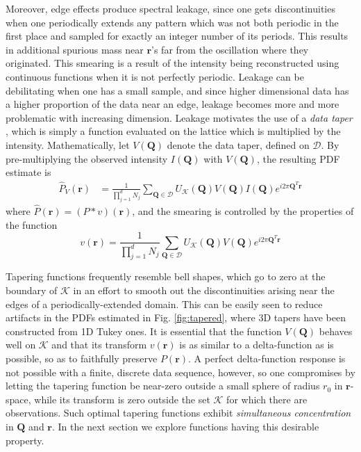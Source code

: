 Moreover, edge effects produce spectral leakage, since one gets discontinuities when
one periodically extends any pattern which was not both periodic in the first place
and sampled for exactly an integer number of its periods. This results in additional
spurious mass near $\mathbf{r}$'s far from the oscillation where they originated.
This smearing is a result of the intensity being reconstructed using continuous
functions when it is not perfectly periodic. Leakage can be debilitating when one has
a small sample, and since higher dimensional data has a higher proportion of the data
near an edge, leakage becomes more and more problematic with increasing dimension.
Leakage motivates the use of a \textit{data taper} \cite{brillinger1981,harris1978},
which is simply a function evaluated on the lattice which is multiplied by the
intensity. Mathematically, let $V(\mathbf{Q})$ denote the data taper, defined on
$\mathcal{D}$. By pre-multiplying the observed intensity $I(\mathbf{Q})$ with
$V(\mathbf{Q})$, the resulting PDF estimate is
\begin{align} \label{eq:Tapersneeded}
  \widehat{P}_V(\mathbf{r}) &= \frac{1}{\prod_{j=1}^d N_j} \sum_{\mathbf{Q}\in
  \mathcal{D}} U_{\mathcal{K}} (\mathbf{Q}) V(\mathbf{Q}) I(\mathbf{Q}) e^{i 2 \pi
  \mathbf{Q}^T\mathbf{r}} 
\end{align}
where  $\widehat{P}(\mathbf{r}) = (P*v)(\mathbf{r})$, and the smearing is controlled
by the properties of the function \begin{equation}
 v(\mathbf{r}) = \frac{1}{\prod_{j=1}^d N_j} \sum_{\mathbf{Q}\in
  \mathcal{D}} U_{\mathcal{K}} (\mathbf{Q}) V (\mathbf{Q}) e^{i 2 \pi
  \mathbf{Q}^T\mathbf{r}}
\end{equation}

Tapering functions frequently resemble bell shapes, which go to zero at the boundary
of $\mathcal{K}$ in an effort to smooth out the discontinuities arising near the
edges of a periodically-extended domain. This can be easily seen to reduce artifacts
in the PDFs estimated in Fig. \ref{fig:tapered}, where 3D tapers have been
constructed from 1D Tukey ones. It is essential that the function $ V(\mathbf{Q})$
behaves well on $\mathcal{K}$ and that its transform $v(\mathbf{r})$ is as similar to
a delta-function as is possible, so as to faithfully preserve $P(\mathbf{r})$. A
perfect delta-function response is not possible with a finite, discrete data
sequence, however, so one compromises by letting the tapering function be near-zero
outside a small sphere of radius $r_0$ in $\mathbf{r}$-space, while its transform is
zero outside the set $\mathcal{K}$ for which there are observations. Such optimal
tapering functions exhibit \textit{simultaneous concentration} in $\mathbf{Q}$ and
$\mathbf{r}$. In the next section we explore functions having this desirable
property.

